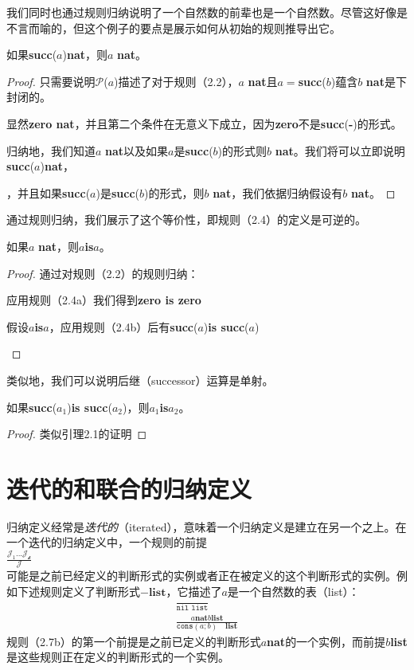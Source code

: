 我们同时也通过规则归纳说明了一个自然数的前辈也是一个自然数。尽管这好像是不言而喻的，但这个例子的要点是展示如何从初始的规则推导出它。
\begin{lemma}
如果\textbf{succ}($a$)\quad\textbf{nat}，则$a$ \textbf{nat}。
\end{lemma}
\begin{proof}
只需要说明$\mathcal{P}$($a$)描述了对于规则（2.2），$a$ \textbf{nat}且$a=$\textbf{succ}($b$)蕴含$b$ \textbf{nat}是下封闭的。
\begin{rules}
[2.2a]显然\textbf{zero nat}，并且第二个条件在无意义下成立，因为\textbf{zero}不是\textbf{succ}(\textbf{-})的形式。
\end{rules}
\begin{rules}
[2.2b]归纳地，我们知道$a$ \textbf{nat}以及如果$a$是\textbf{succ}($b$)的形式则$b$ \textbf{nat}。我们将可以立即说明\textbf{succ}($a$)\quad\textbf{nat}，
\end{rules}，并且如果\textbf{succ}($a$)是\textbf{succ}($b$)的形式，则$b$ \textbf{nat}，我们依据归纳假设有$b$ \textbf{nat}。
\end{proof}
通过规则归纳，我们展示了这个等价性，即规则（2.4）的定义是可逆的。
\begin{lemma}
如果$a$ \textbf{nat}，则$a$\textbf{is}$a$。
\end{lemma}
\begin{proof}
通过对规则（2.2）的规则归纳：
\begin{rules}
[2.2a]应用规则（2.4a）我们得到\textbf{zero is zero}
\end{rules}
\begin{rules}
[2.2b]假设$a$\textbf{is}$a$，应用规则（2.4b）后有\textbf{succ}($a$)\textbf{is succ}($a$)
\end{rules}
\end{proof}
类似地，我们可以说明后继（successor）运算是单射。
\begin{lemma}
如果\textbf{succ}($a_{1}$)\textbf{is succ}($a_{2}$)，则$a_{1}$\textbf{is}$a_{2}$。
\end{lemma}
\begin{proof}
类似引理2.1的证明
\end{proof}
\section{迭代的和联合的归纳定义}
归纳定义经常是\textit{迭代的}（iterated），意味着一个归纳定义是建立在另一个之上。在一个迭代的归纳定义中，一个规则的前提 \\
$\frac{\mathcal{J_{1} ... J_{k}}}{\mathcal{J}} $\\
可能是之前已经定义的判断形式的实例或者正在被定义的这个判断形式的实例。例如下述规则定义了判断形式$- \textbf{list}$，它描述了$a$是一个自然数的表（list）：
\begin{align*}
\frac{}{\texttt{nil list}} \\
\frac{a\textbf{nat}   b\textbf{list}}{\texttt{cons}(a;b)\quad\textbf{list}}
\end{align*}
规则（2.7b）的第一个前提是之前已定义的判断形式$a$\textbf{nat}的一个实例，而前提$b$\textbf{list}是这些规则正在定义的判断形式的一个实例。

